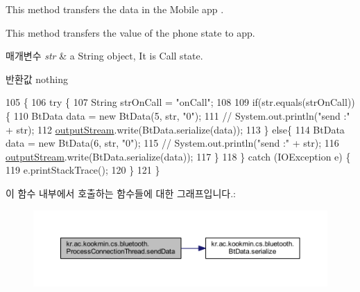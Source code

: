 This method transfers the data in the Mobile app . 

This method transfers the value of the phone state to app. 
\begin{DoxyParams}{매개변수}
{\em str} & a String object, It is Call state. \\
\hline
\end{DoxyParams}
\begin{DoxyReturn}{반환값}
nothing 
\end{DoxyReturn}

\begin{DoxyCode}
105                                          \{
106     \textcolor{keywordflow}{try} \{
107       String strOnCall = \textcolor{stringliteral}{"onCall"};
108 
109       \textcolor{keywordflow}{if}(str.equals(strOnCall)) \{
110         BtData data = \textcolor{keyword}{new} BtData(5, str, \textcolor{stringliteral}{"0"});
111 \textcolor{comment}{//        System.out.println("send :" + str);}
112         \hyperlink{classkr_1_1ac_1_1kookmin_1_1cs_1_1bluetooth_1_1_process_connection_thread_ab283f9949cd2d643769616474eecba8c}{outputStream}.write(BtData.serialize(data));
113       \} \textcolor{keywordflow}{else}\{
114         BtData data = \textcolor{keyword}{new} BtData(6, str, \textcolor{stringliteral}{"0"});
115 \textcolor{comment}{//        System.out.println("send :" + str);}
116         \hyperlink{classkr_1_1ac_1_1kookmin_1_1cs_1_1bluetooth_1_1_process_connection_thread_ab283f9949cd2d643769616474eecba8c}{outputStream}.write(BtData.serialize(data));
117       \}
118     \} \textcolor{keywordflow}{catch} (IOException e) \{
119       e.printStackTrace();
120     \}
121   \}
\end{DoxyCode}


이 함수 내부에서 호출하는 함수들에 대한 그래프입니다.\+:\nopagebreak
\begin{figure}[H]
\begin{center}
\leavevmode
\includegraphics[width=350pt]{classkr_1_1ac_1_1kookmin_1_1cs_1_1bluetooth_1_1_process_connection_thread_afd3322fad0409741040de7c478210218_cgraph}
\end{center}
\end{figure}




